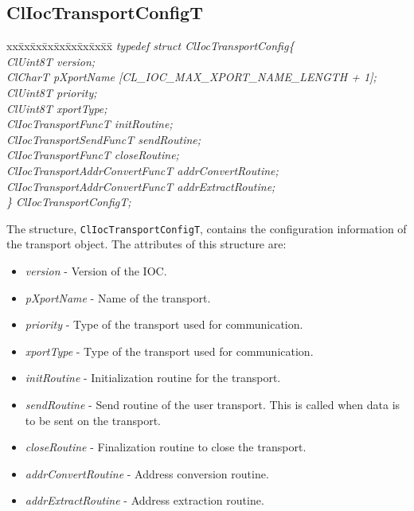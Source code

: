 \begin{flushleft}
\subsection{ClIocTransportConfigT}
\begin{tabbing}
xx\=xx\=xx\=xx\=xx\=xx\=xx\=xx\=xx\=\kill
\textit{typedef struct ClIocTransportConfig\{}\\
\>\>\>\>\textit{ClUint8T version;}\\
\>\>\>\>\textit{ClCharT pXportName \mbox{[}CL\_IOC\_MAX\_XPORT\_NAME\_LENGTH + 1\mbox{]};}\\
\>\>\>\>\textit{ClUint8T priority;}\\
\>\>\>\>\textit{ClUint8T xportType;}\\
\>\>\>\>\textit{ClIocTransportFuncT initRoutine;}\\
\>\>\>\>\textit{ClIocTransportSendFuncT sendRoutine;}\\
\>\>\>\>\textit{ClIocTransportFuncT closeRoutine;}\\
\>\>\>\>\textit{ClIocTransportAddrConvertFuncT addrConvertRoutine;}\\
\>\>\>\>\textit{ClIocTransportAddrConvertFuncT addrExtractRoutine;}\\
\textit{\} ClIocTransportConfigT;}\end{tabbing}
The structure, {\tt{ClIocTransportConfigT}}, contains the configuration information of the transport object. The attributes of this structure are:
\begin{itemize}
\item
\textit{version} - Version of the IOC.
\item
\textit{pXportName} - Name of the transport.
\item
\textit{priority} - Type of the transport used for communication.
\item
\textit{xportType} - Type of the transport used for communication.
\item
\textit{initRoutine} - Initialization routine for the transport.
\item
\textit{sendRoutine} - Send routine of the user transport. This is called when data
 is to be sent on the transport.
\item
\textit{closeRoutine} - Finalization routine to close the transport.
\item
\textit{addrConvertRoutine} - Address conversion routine.
\item
\textit{addrExtractRoutine} - Address extraction routine.
\end{itemize}





\end{flushleft}
